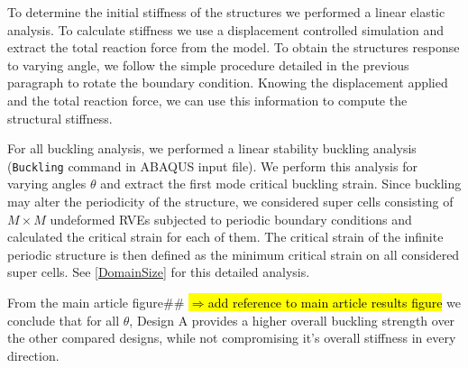 \documentclass[10pt,twoside]{fernandes_supp}
\newcommand{\mf}[1]{\noindent\color{color2}\sethlcolor{cyan}\hl{$\Longrightarrow$#1}\normalcolor}
\begin{document}
To determine the initial stiffness of the structures we performed a linear elastic analysis. To calculate stiffness we use a displacement controlled simulation and extract the total reaction force from the model. To obtain the structures response to varying angle, we follow the simple procedure detailed in the previous paragraph to rotate the boundary condition. Knowing the displacement applied and the total reaction force, we can use this information to compute the structural stiffness.

For all buckling analysis, we performed a linear stability buckling analysis ({\tt *Buckling} command in ABAQUS input file). We perform this analysis for varying angles $\theta$ and extract the first mode critical buckling strain. Since buckling may alter the periodicity of the
structure, we considered super cells consisting of $M \times M$
undeformed RVEs subjected to periodic boundary
conditions and calculated the critical strain for each of
them. The critical strain of the infinite periodic structure is
then defined as the minimum critical strain on all considered
super cells. See \cref{DomainSize} for this detailed analysis.

From the main article figure\#\# \mf{add reference to main article results figure} we conclude that for all $\theta$, Design A provides a higher overall buckling strength over the other compared designs, while not compromising it's overall stiffness in every direction.

\end{document}
